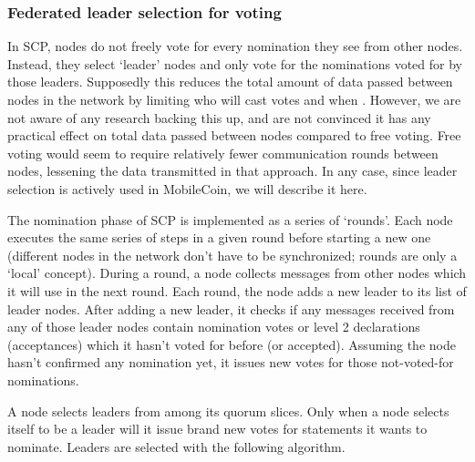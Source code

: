 \subsubsection{Federated leader selection for voting}

In SCP, nodes do not freely vote for every nomination they see from other nodes. Instead, they select `leader' nodes and only vote for the nominations voted for by those leaders. Supposedly this reduces the total amount of data passed between nodes in the network by limiting who will cast votes and when \cite{stellar-consensus-protocol}. However, we are not aware of any research backing this up, and are not convinced it has any practical effect on total data passed between nodes compared to free voting. Free voting would seem to require relatively fewer communication rounds between nodes, lessening the data transmitted in that approach. In any case, since leader selection is actively used in MobileCoin, we will describe it here.

The nomination phase of SCP is implemented as a series of `rounds'. Each node executes the same series of steps in a given round before starting a new one (different nodes in the network don't have to be synchronized; rounds are only a `local' concept). During a round, a node collects messages from other nodes which it will use in the next round. Each round, the node adds a new leader to its list of leader nodes. After adding a new leader, it checks if any messages received from any of those leader nodes contain nomination votes or level 2 declarations (acceptances) which it hasn't voted for before (or accepted). Assuming the node hasn't confirmed any nomination yet, it issues new votes for those not-voted-for nominations.

A node selects leaders from among its quorum slices. Only when a node selects itself to be a leader will it issue brand new votes for statements it wants to nominate. Leaders are selected with the following algorithm.

